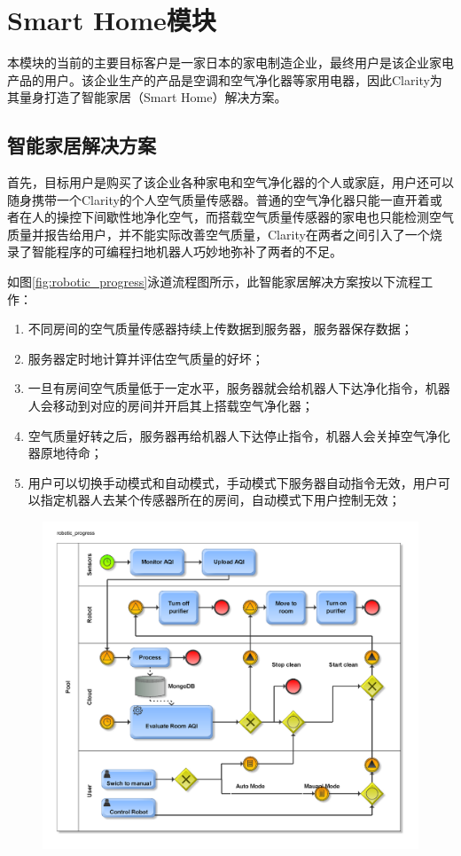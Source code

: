 \section{Smart Home模块}
本模块的当前的主要目标客户是一家日本的家电制造企业，最终用户是该企业家电产品的用户。该企业生产的产品是空调和空气净化器等家用电器，因此Clarity为其量身打造了智能家居（Smart Home）解决方案。
\subsection{智能家居解决方案}
首先，目标用户是购买了该企业各种家电和空气净化器的个人或家庭，用户还可以随身携带一个Clarity的个人空气质量传感器。普通的空气净化器只能一直开着或者在人的操控下间歇性地净化空气，而搭载空气质量传感器的家电也只能检测空气质量并报告给用户，并不能实际改善空气质量，Clarity在两者之间引入了一个烧录了智能程序的可编程扫地机器人巧妙地弥补了两者的不足。

如图\ref{fig:robotic_progress}泳道流程图所示，此智能家居解决方案按以下流程工作：
\begin{enumerate}
  \item 不同房间的空气质量传感器持续上传数据到服务器，服务器保存数据；
  \item 服务器定时地计算并评估空气质量的好坏；
  \item 一旦有房间空气质量低于一定水平，服务器就会给机器人下达净化指令，机器人会移动到对应的房间并开启其上搭载空气净化器；
  \item 空气质量好转之后，服务器再给机器人下达停止指令，机器人会关掉空气净化器原地待命；
  \item 用户可以切换手动模式和自动模式，手动模式下服务器自动指令无效，用户可以指定机器人去某个传感器所在的房间，自动模式下用户控制无效；
\end{enumerate}

\begin{figure}[!htp]
 \centering
 \includegraphics[width=\textwidth]{figure/robotic_progress.pdf}
\end{figure}

